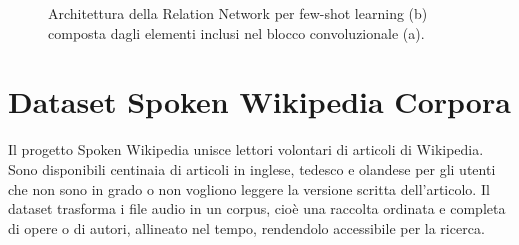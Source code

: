 \documentclass[12pt,a4paper,titlepage]{article}
\begin{document}
\begin{figure}[h]
	\centering
	\qquad
	\label{fig:relation_network_architecture}	
	\caption{Architettura della Relation Network per few-shot learning (b) composta dagli elementi inclusi nel blocco convoluzionale (a).~\cite{DBLP:journals/corr/abs-1711-06025}}
\end{figure}

\clearpage

\section{Dataset Spoken Wikipedia Corpora}
\label{sec:spoken_wikipedia_corpora}
Il progetto Spoken Wikipedia unisce lettori volontari di articoli di Wikipedia. Sono disponibili centinaia di articoli in inglese, tedesco e olandese per gli utenti che non sono in grado o non vogliono leggere la versione scritta dell'articolo. Il dataset trasforma i file audio in un corpus, cioè una raccolta ordinata e completa di opere o di autori, allineato nel tempo, rendendolo accessibile per la ricerca.\cite{minining_spoken_wikipedia}
\end{document}
